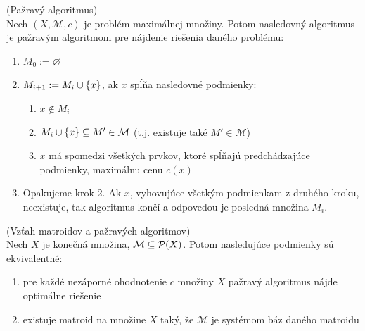 \begin{definition}{(Pažravý algoritmus)}\\
Nech $(X, \mathcal{M}, c)$ je problém maximálnej množiny. Potom nasledovný algoritmus je pažravým algoritmom pre nájdenie riešenia
daného problému:
\begin{enumerate}
    \item $M_0 := \varnothing$
    \item $M_{i+1} := M_i \cup \left\{x\right\}$, ak $x$ spĺňa nasledovné podmienky:
    \begin{enumerate}
        \item $x \not\in M_i$
        \item $M_i \cup \left\{x\right\} \subseteq M' \in \mathcal{M}$ (t.j. existuje také $M' \in \mathcal{M}$)
        \item $x$ má spomedzi všetkých prvkov, ktoré spĺňajú predchádzajúce podmienky, maximálnu cenu $c(x)$
    \end{enumerate}
    \item Opakujeme krok 2. Ak $x$, vyhovujúce všetkým podmienkam z druhého kroku, neexistuje, tak algoritmus končí a odpoveďou je posledná množina $M_i$.
\end{enumerate}
\end{definition}

\begin{theorem}{(Vzťah matroidov a pažravých algoritmov)}\\
Nech $X$ je konečná množina, $\mathcal{M} \subseteq \mathcal{P}(X)$. Potom nasledujúce podmienky sú ekvivalentné:
\begin{enumerate}
    \item pre každé nezáporné ohodnotenie $c$ množiny $X$ pažravý algoritmus nájde optimálne riešenie
    \item existuje matroid na množine $X$ taký, že $\mathcal{M}$ je systémom báz daného matroidu 
\end{enumerate}
\end{theorem}
